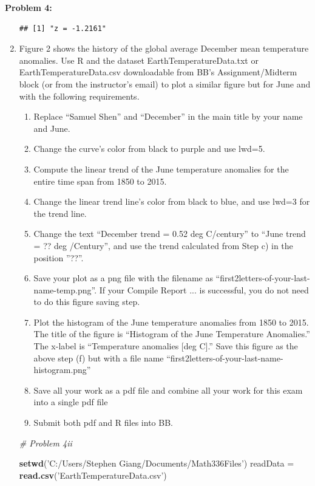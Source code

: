 \documentclass[11pt]{article}
\newenvironment{problem}[1]{\textbf{Problem #1: }}{\newpage}
\newenvironment{Shaded}{\begin{snugshade}}{\end{snugshade}}
\newcommand{\CommentTok}[1]{\textcolor[rgb]{0.56,0.35,0.01}{\textit{#1}}}
\newcommand{\KeywordTok}[1]{\textcolor[rgb]{0.13,0.29,0.53}{\textbf{#1}}}
\newcommand{\NormalTok}[1]{#1}
\newcommand{\StringTok}[1]{\textcolor[rgb]{0.31,0.60,0.02}{#1}}
\begin{document}
\begin{problem}{4}
\begin{enumerate}[label = (\roman*)]
\begin{verbatim}
## [1] "z = -1.2161"
\end{verbatim}
		\newpage
		\item Figure 2 shows the history of the global average December mean temperature anomalies. Use R
		and the dataset {\selectfont EarthTemperatureData.txt} or {\selectfont EarthTemperatureData.csv} downloadable from BB’s Assignment/Midterm block (or from the instructor’s email) to plot a similar figure but
		for June and with the following requirements.
		\begin{enumerate}[label = (\alph*)]
			\item Replace “Samuel Shen” and “December” in the main title by your name and June.
			\item Change the curve’s color from black to purple and use { \selectfont lwd=5}.
			\item Compute the linear trend of the June temperature anomalies for the entire time span from 1850
			to 2015.
			\item Change the linear trend line’s color from black to blue, and use { \selectfont lwd=3} for the trend line.
			\item Change the text “December trend = 0.52 deg C/century” to “June trend = ?? deg /Century”, and
			use the trend calculated from Step c) in the position ”??”.
			\item Save your plot as a png file with the filename as “first2letters-of-your-last-name-temp.png”. If your
			{ \selectfont Compile Report ...} is successful, you do not need to do this figure saving step.
			\item Plot the histogram of the June temperature anomalies from 1850 to 2015. The title of the figure is
			“Histogram of the June Temperature Anomalies.” The x-label is “Temperature anomalies [deg C].” Save
			this figure as the above step (f) but with a file name “first2letters-of-your-last-name-histogram.png”
			\item Save all your work as a pdf file and combine all your work for this exam into a single pdf file
			\item  Submit both pdf and R files into BB.
		\end{enumerate}
		\newpage
\begin{Shaded}
\begin{Highlighting}[]
\CommentTok{# Problem 4ii}

\KeywordTok{setwd}\NormalTok{(}\StringTok{'C:/Users/Stephen Giang/Documents/Math336Files'}\NormalTok{)}
\NormalTok{readData =}\StringTok{ }\KeywordTok{read.csv}\NormalTok{(}\StringTok{'EarthTemperatureData.csv'}\NormalTok{)}


\end{Highlighting}
\end{Shaded}
\end{enumerate}
\end{problem}
\end{document}
